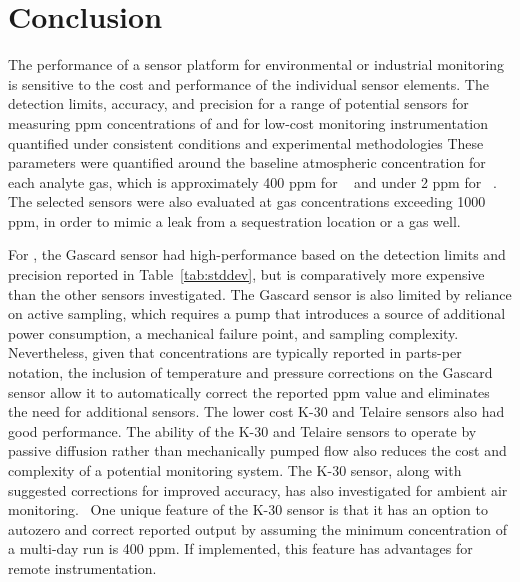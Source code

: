 \documentclass[sensors,article,submit,moreauthors,pdftex]{Definitions/mdpi}
\begin{document}
			
			\FloatBarrier	
	
	\section{Conclusion}
	
		The performance of a sensor platform for environmental or industrial monitoring is sensitive to the cost and performance of the individual sensor elements.
		The detection limits, accuracy, and precision for a range of potential sensors for measuring ppm concentrations of  and  for low-cost monitoring instrumentation quantified under consistent conditions and experimental methodologies  
		These parameters were quantified around the baseline atmospheric concentration for each analyte gas, which is approximately 400 ppm for ~\cite{blasing_recent_2016,dlugokencky_trends_2016} and under 2 ppm for ~\cite{turner_large_2016,bamberger_spatial_2014,dlugokencky_trends_2016-1}.
		The selected sensors were also evaluated at gas concentrations exceeding 1000 ppm, in order to mimic a leak from a  sequestration location or a gas well.
			
		
		For , the Gascard sensor had high-performance based on the detection limits and precision reported in Table~\ref{tab:stddev}, but is comparatively more expensive than the other sensors investigated.
		The Gascard sensor is also limited by reliance on active sampling, which requires a pump that introduces a source of additional power consumption, a mechanical failure point, and sampling complexity.
		Nevertheless, given that concentrations are typically reported in parts-per notation, the inclusion of temperature and pressure corrections on the Gascard sensor allow it to automatically correct the reported ppm value and eliminates the need for additional sensors.
		The lower cost  K-30 and Telaire sensors also had good performance.
		The ability of the K-30 and Telaire sensors to operate by passive diffusion rather than mechanically pumped flow also reduces the cost and complexity of a potential monitoring system.
		The K-30 sensor, along with suggested corrections for improved accuracy, has also investigated for ambient air monitoring.~\cite{amt-10-2383-2017}
		One unique feature of the K-30 sensor is that it has an option to autozero and correct reported output by assuming the minimum concentration of a multi-day run is 400 ppm.
		If implemented, this feature has advantages for remote instrumentation.
		
\end{document}
